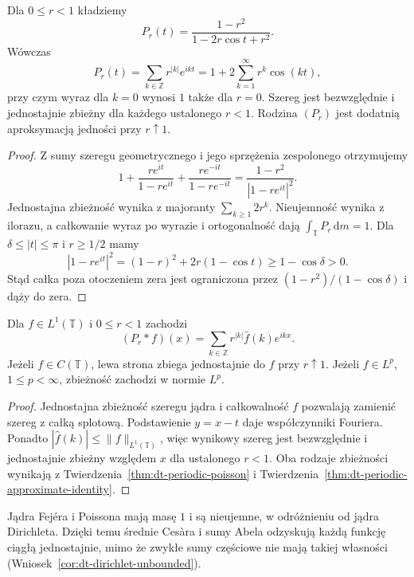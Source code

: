 \begin{twierdzenie}
\label{thm:dt-periodic-poisson}
Dla $0\le r<1$ kładziemy
\[
 P_r(t)=\frac{1-r^2}{1-2r\cos t+r^2}.
\]
Wówczas
\[
 P_r(t)=\sum_{k\in\mathbb Z}r^{|k|}e^{ikt}
 =1+2\sum_{k=1}^\infty r^k\cos(kt),
\]
przy czym wyraz dla $k=0$ wynosi $1$ także
dla $r=0$. Szereg jest bezwzględnie i jednostajnie
zbieżny dla każdego ustalonego $r<1$.
Rodzina $(P_r)$ jest dodatnią aproksymacją jedności
przy $r\uparrow1$.
\end{twierdzenie}
\begin{proof}
Z sumy szeregu geometrycznego i jego sprzężenia
zespolonego otrzymujemy
\[
 1+\frac{re^{it}}{1-re^{it}}
   +\frac{re^{-it}}{1-re^{-it}}
 =\frac{1-r^2}{|1-re^{it}|^2}.
\]
Jednostajna zbieżność wynika z majoranty
$\sum_{k\ge1}2r^k$. Nieujemność wynika
z ilorazu, a całkowanie wyraz po wyrazie
i ortogonalność dają $\int_{\mathbb T}P_r\,\mathrm dm=1$.
Dla $\delta\le|t|\le\pi$ i $r\ge1/2$ mamy
\[
 |1-re^{it}|^2=(1-r)^2+2r(1-\cos t)
 \ge1-\cos\delta>0.
\]
Stąd całka poza otoczeniem zera jest ograniczona
przez $(1-r^2)/(1-\cos\delta)$ i dąży do zera.
\end{proof}

\begin{wniosek}
\label{cor:dt-poisson-abel}
Dla $f\in L^1(\mathbb T)$ i $0\le r<1$ zachodzi
\[
 (P_r*f)(x)=\sum_{k\in\mathbb Z}r^{|k|}
 \widehat f(k)e^{ikx}.
\]
Jeżeli $f\in C(\mathbb T)$, lewa strona zbiega
jednostajnie do $f$ przy $r\uparrow1$.
Jeżeli $f\in L^p$, $1\le p<\infty$,
zbieżność zachodzi w normie $L^p$.
\end{wniosek}
\begin{proof}
Jednostajna zbieżność szeregu jądra i całkowalność
$f$ pozwalają zamienić szereg z całką splotową.
Podstawienie $y=x-t$ daje współczynniki Fouriera.
Ponadto $|\widehat f(k)|\le\|f\|_{L^1(\mathbb T)}$,
więc wynikowy szereg jest bezwzględnie i jednostajnie
zbieżny względem $x$ dla ustalonego $r<1$.
Oba rodzaje zbieżności wynikają z
Twierdzenia~\ref{thm:dt-periodic-poisson}
i Twierdzenia~\ref{thm:dt-periodic-approximate-identity}.
\end{proof}

Jądra Fejéra i Poissona mają masę $1$ i są nieujemne,
w odróżnieniu od jądra Dirichleta. Dzięki temu
średnie Cesàra i sumy Abela odzyskują każdą
funkcję ciągłą jednostajnie, mimo że zwykłe
sumy częściowe nie mają takiej własności
(Wniosek~\ref{cor:dt-dirichlet-unbounded}).

